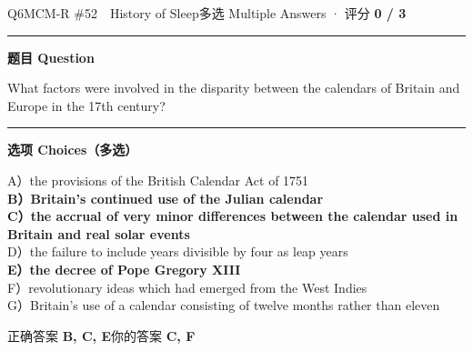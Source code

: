 \documentclass[11pt]{article}
\newcommand{\ptesub}[1]{%
  \par\needspace{2\baselineskip}\smallskip
  {\color{cAccent}\rule[-0.2ex]{3pt}{1.05em}}\hspace{6pt}%
  {\bfseries\color{cHead}#1}\par\nopagebreak\smallskip}
\begin{document}
\begin{qblock}{Q6\quad MCM-R \#52\ \ History of Sleep}{多选 Multiple Answers · 评分 \textcolor{cAccent}{\bfseries 0 / 3}}
\ptesub{题目 Question}
\begin{notebox}\small What factors were involved in the disparity between the calendars of Britain and Europe in the 17th century?\end{notebox}
\ptesub{选项 Choices（多选）}
{\small
A）the provisions of the British Calendar Act of 1751\\
{\color{cFix}\textbf{B）Britain's continued use of the Julian calendar}}\\
{\color{cFix}\textbf{C）the accrual of very minor differences between the calendar used in Britain and real solar events}}\\
D）the failure to include years divisible by four as leap years\\
{\color{cFix}\textbf{E）the decree of Pope Gregory XIII}}\\
F）revolutionary ideas which had emerged from the West Indies\\
G）Britain's use of a calendar consisting of twelve months rather than eleven}
\smallskip\par
{\small 正确答案 \textcolor{cFix}{\bfseries B, C, E}\qquad 你的答案 {\color{cWrong}\bfseries C, F}}
\end{qblock}
\end{document}
